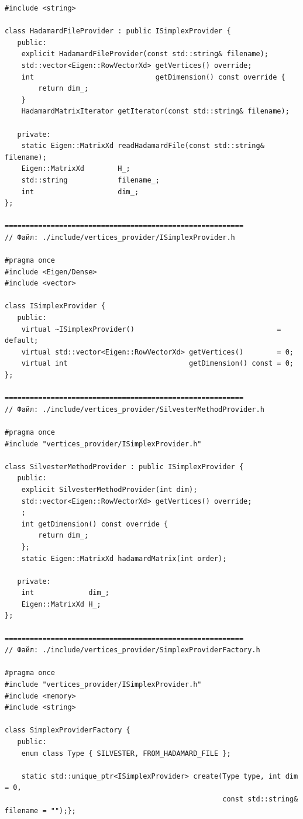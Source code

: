 \documentclass[appendix_B]{subfiles}
\begin{document}
\begin{lstlisting}
#include <string>

class HadamardFileProvider : public ISimplexProvider {
   public:
    explicit HadamardFileProvider(const std::string& filename);
    std::vector<Eigen::RowVectorXd> getVertices() override;
    int                             getDimension() const override {
        return dim_;
    }
    HadamardMatrixIterator getIterator(const std::string& filename);

   private:
    static Eigen::MatrixXd readHadamardFile(const std::string& filename);
    Eigen::MatrixXd        H_;
    std::string            filename_;
    int                    dim_;
};

=========================================================
// Файл: ./include/vertices_provider/ISimplexProvider.h

#pragma once
#include <Eigen/Dense>
#include <vector>

class ISimplexProvider {
   public:
    virtual ~ISimplexProvider()                                  = default;
    virtual std::vector<Eigen::RowVectorXd> getVertices()        = 0;
    virtual int                             getDimension() const = 0;
};

=========================================================
// Файл: ./include/vertices_provider/SilvesterMethodProvider.h

#pragma once
#include "vertices_provider/ISimplexProvider.h"

class SilvesterMethodProvider : public ISimplexProvider {
   public:
    explicit SilvesterMethodProvider(int dim);
    std::vector<Eigen::RowVectorXd> getVertices() override;
    ;
    int getDimension() const override {
        return dim_;
    };
    static Eigen::MatrixXd hadamardMatrix(int order);

   private:
    int             dim_;
    Eigen::MatrixXd H_;
};

=========================================================
// Файл: ./include/vertices_provider/SimplexProviderFactory.h

#pragma once
#include "vertices_provider/ISimplexProvider.h"
#include <memory>
#include <string>

class SimplexProviderFactory {
   public:
    enum class Type { SILVESTER, FROM_HADAMARD_FILE };

    static std::unique_ptr<ISimplexProvider> create(Type type, int dim = 0,
                                                    const std::string& filename = "");};
\end{lstlisting}
\newpage
\end{document}
